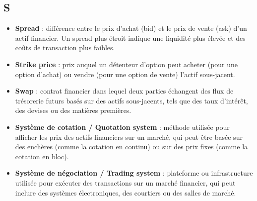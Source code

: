 \documentclass[a4paper,10pt]{article}
\begin{document}
\begin{multicols}{2}
\section*{S}
\begin{itemize}
  \item \textbf{Spread} : différence entre le prix d’achat (bid) et le prix de vente (ask) d’un actif financier. Un spread plus étroit indique une liquidité plus élevée et des coûts de transaction plus faibles.
  \item \textbf{Strike price} : prix auquel un détenteur d’option peut acheter (pour une option d’achat) ou vendre (pour une option de vente) l’actif sous-jacent.
  \item \textbf{Swap} : contrat financier dans lequel deux parties échangent des flux de trésorerie futurs basés sur des actifs sous-jacents, tels que des taux d’intérêt, des devises ou des matières premières.
  \item \textbf{Système de cotation / Quotation system} : méthode utilisée pour afficher les prix des actifs financiers sur un marché, qui peut être basée sur des enchères (comme la cotation en continu) ou sur des prix fixes (comme la cotation en bloc).
  \item \textbf{Système de négociation / Trading system} : plateforme ou infrastructure utilisée pour exécuter des transactions sur un marché financier, qui peut inclure des systèmes électroniques, des courtiers ou des salles de marché.
\end{itemize}


\end{multicols}
\end{document}
